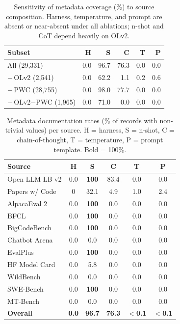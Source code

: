 \documentclass[11pt]{article}
\begin{document}
\begin{table}[t]
\centering
\small
\setlength{\tabcolsep}{3pt}
\caption{Sensitivity of metadata coverage (\%) to source
composition. Harness, temperature, and prompt are absent or
near-absent under all ablations; n-shot and CoT depend heavily
on OLv2.}
\label{tab:ablation}
\begin{tabular}{lrrrrr}
\toprule
\textbf{Subset} & \textbf{H} & \textbf{S} & \textbf{C}
  & \textbf{T} & \textbf{P} \\
\midrule
All (29,331)             & 0.0 & 96.7 & 76.3 & 0.0 & 0.0 \\
$-$\,OLv2 (2,541)       & 0.0 & 62.2 &  1.1 & 0.2 & 0.6 \\
$-$\,PWC (28,755)        & 0.0 & 98.0 & 77.7 & 0.0 & 0.0 \\
$-$\,OLv2$-$PWC (1,965) & 0.0 & 71.0 &  0.0 & 0.0 & 0.0 \\
\bottomrule
\end{tabular}
\end{table}

\begin{table}[t]
\centering
\small
\setlength{\tabcolsep}{3pt}
\caption{Metadata documentation rates (\% of records with
non-trivial values) per source. H = harness, S = n-shot,
C = chain-of-thought, T = temperature, P = prompt template.
Bold = 100\%.}
\label{tab:coverage}
\begin{tabular}{lccccc}
\toprule
\textbf{Source} & \textbf{H} & \textbf{S} & \textbf{C}
  & \textbf{T} & \textbf{P} \\
\midrule
Open LLM LB v2 &  0.0 & \textbf{100} & 83.4 & 0.0 & 0.0 \\
Papers w/ Code &     0 & 32.1 & 4.9 & 1.0 & 2.4 \\
AlpacaEval 2   &  0.0 & \textbf{100} & 0.0 & 0.0 & 0.0 \\
BFCL           &  0.0 & \textbf{100} & 0.0 & 0.0 & 0.0 \\
BigCodeBench   &  0.0 & \textbf{100} & 0.0 & 0.0 & 0.0 \\
Chatbot Arena  &  0.0 &  0.0 & 0.0 & 0.0 & 0.0 \\
EvalPlus       &  0.0 & \textbf{100} & 0.0 & 0.0 & 0.0 \\
HF Model Card  &  0.0 &  5.8 & 0.0 & 0.0 & 0.0 \\
WildBench      &  0.0 &  0.0 & 0.0 & 0.0 & 0.0 \\
SWE-Bench      &  0.0 & \textbf{100} & 0.0 & 0.0 & 0.0 \\
MT-Bench       &  0.0 &  0.0 & 0.0 & 0.0 & 0.0 \\
\midrule
\textbf{Overall} & \textbf{0.0} & \textbf{96.7} & \textbf{76.3}
  & \textbf{$<$0.1} & \textbf{$<$0.1} \\
\bottomrule
\end{tabular}
\end{table}
\end{document}
